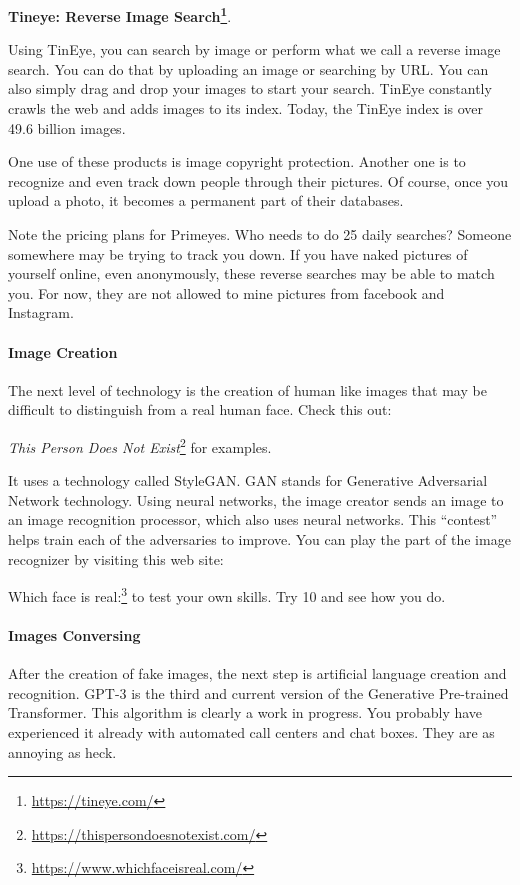 \textbf{Tineye: Reverse Image Search\footnote{\url{https://tineye.com/}}}.


\begin{quotex}
Using TinEye, you can search by image or perform what we call a reverse image search. You can do that by uploading an image or searching by URL. You can also simply drag and drop your images to start your search. TinEye constantly crawls the web and adds images to its index. Today, the TinEye index is over 49.6 billion images.
\end{quotex}


One use of these products is image copyright protection. Another one is to recognize and even track down people through their pictures. Of course, once you upload a photo, it becomes a permanent part of their databases.

Note the pricing plans for Primeyes. Who needs to do 25 daily searches? Someone somewhere may be trying to track you down. If you have naked pictures of yourself online, even anonymously, these reverse searches may be able to match you. For now, they are not allowed to mine pictures from facebook and Instagram.

\paragraph{Image Creation}


The next level of technology is the creation of human like images that may be difficult to distinguish from a real human face. Check this out:

\textit{This Person Does Not Exist}\footnote{\url{https://thispersondoesnotexist.com/}} for examples.

It uses a technology called StyleGAN. GAN stands for Generative Adversarial Network technology. Using neural networks, the image creator sends an image to an image recognition processor, which also uses neural networks. This ``contest'' helps train each of the adversaries to improve. You can play the part of the image recognizer by visiting this web site:

Which face is real:\footnote{\url{https://www.whichfaceisreal.com/}} to test your own skills. Try 10 and see how you do.

\paragraph{Images Conversing}


After the creation of fake images, the next step is artificial language creation and recognition. GPT-3 is the third and current version of the Generative Pre-trained Transformer. This algorithm is clearly a work in progress. You probably have experienced it already with automated call centers and chat boxes. They are as annoying as heck.

